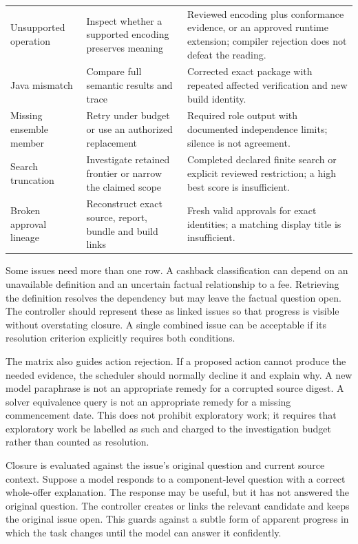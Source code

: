 \begin{longtable}{@{}P{27mm}P{56mm}P{65mm}@{}}
Unsupported operation & Inspect whether a supported encoding preserves meaning & Reviewed encoding plus conformance evidence, or an approved runtime extension; compiler rejection does not defeat the reading.\\
Java mismatch & Compare full semantic results and trace & Corrected exact package with repeated affected verification and new build identity.\\
Missing ensemble member & Retry under budget or use an authorized replacement & Required role output with documented independence limits; silence is not agreement.\\
Search truncation & Investigate retained frontier or narrow the claimed scope & Completed declared finite search or explicit reviewed restriction; a high best score is insufficient.\\
Broken approval lineage & Reconstruct exact source, report, bundle and build links & Fresh valid approvals for exact identities; a matching display title is insufficient.\\
\bottomrule
\end{longtable}

Some issues need more than one row. A cashback classification can depend on an
unavailable definition and an uncertain factual relationship to a fee. Retrieving
the definition resolves the dependency but may leave the factual question open.
The controller should represent these as linked issues so that progress is visible
without overstating closure. A single combined issue can be acceptable if its
resolution criterion explicitly requires both conditions.

The matrix also guides action rejection. If a proposed action cannot produce the
needed evidence, the scheduler should normally decline it and explain why. A new
model paraphrase is not an appropriate remedy for a corrupted source digest. A
solver equivalence query is not an appropriate remedy for a missing commencement
date. This does not prohibit exploratory work; it requires that exploratory work
be labelled as such and charged to the investigation budget rather than counted
as resolution.

Closure is evaluated against the issue's original question and current source
context. Suppose a model responds to a component-level question with a correct
whole-offer explanation. The response may be useful, but it has not answered the
original question. The controller creates or links the relevant candidate and
keeps the original issue open. This guards against a subtle form of apparent
progress in which the task changes until the model can answer it confidently.

